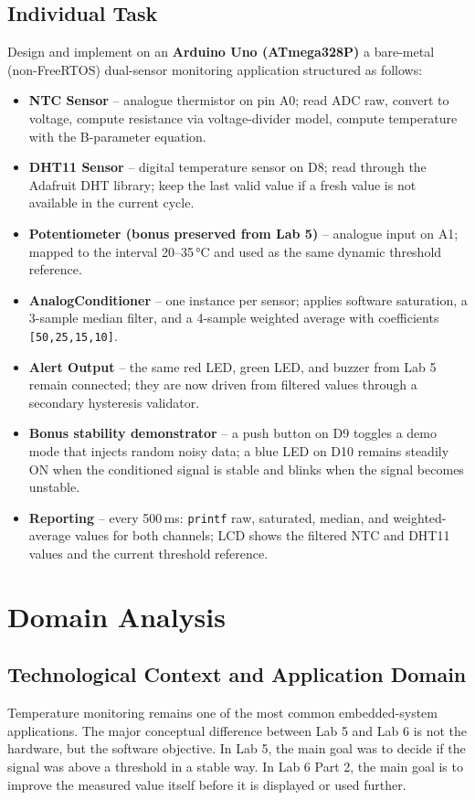 \documentclass[12pt]{article}
\begin{document}
\subsection*{Individual Task}
\hspace{0.8cm} Design and implement on an \textbf{Arduino Uno (ATmega328P)} a bare-metal (non-FreeRTOS) dual-sensor monitoring application structured as follows:

\begin{itemize}
    \item \textbf{NTC Sensor} -- analogue thermistor on pin A0; read ADC raw, convert to voltage, compute resistance via voltage-divider model, compute temperature with the B-parameter equation.
    \item \textbf{DHT11 Sensor} -- digital temperature sensor on D8; read through the Adafruit DHT library; keep the last valid value if a fresh value is not available in the current cycle.
    \item \textbf{Potentiometer (bonus preserved from Lab 5)} -- analogue input on A1; mapped to the interval 20--35\,°C and used as the same dynamic threshold reference.
    \item \textbf{AnalogConditioner} -- one instance per sensor; applies software saturation, a 3-sample median filter, and a 4-sample weighted average with coefficients \texttt{[50,25,15,10]}.
    \item \textbf{Alert Output} -- the same red LED, green LED, and buzzer from Lab 5 remain connected; they are now driven from filtered values through a secondary hysteresis validator.
    \item \textbf{Bonus stability demonstrator} -- a push button on D9 toggles a demo mode that injects random noisy data; a blue LED on D10 remains steadily ON when the conditioned signal is stable and blinks when the signal becomes unstable.
    \item \textbf{Reporting} -- every 500\,ms: \texttt{printf} raw, saturated, median, and weighted-average values for both channels; LCD shows the filtered NTC and DHT11 values and the current threshold reference.
\end{itemize}

\section{Domain Analysis}

\subsection{Technological Context and Application Domain}
\hspace{0.8cm} Temperature monitoring remains one of the most common embedded-system applications. The major conceptual difference between Lab 5 and Lab 6 is not the hardware, but the software objective. In Lab 5, the main goal was to decide if the signal was above a threshold in a stable way. In Lab 6 Part 2, the main goal is to improve the measured value itself before it is displayed or used further.
\end{document}
